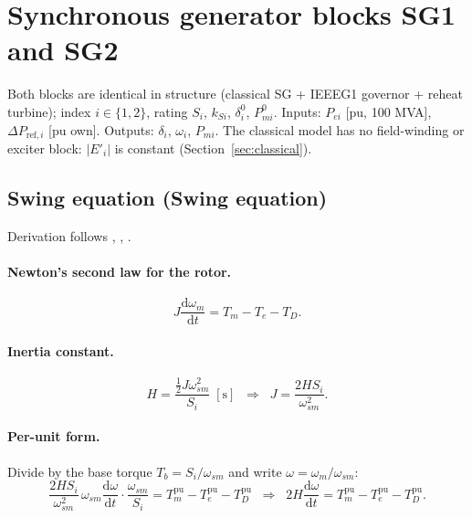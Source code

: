 \documentclass[11pt,a4paper]{article}
\numberwithin{equation}{section}
\newcommand{\dd}{\mathrm{d}}
\newcommand{\blk}[1]{\textsf{#1}}
\begin{document}
\section{Synchronous generator blocks \blk{SG1} and \blk{SG2}}
Both blocks are identical in structure (classical SG + IEEEG1 governor + reheat turbine); index $i\in\{1,2\}$, rating $S_i$, $k_{Si}$, $\delta_i^0$, $P_{mi}^0$.
Inputs: $P_{ei}$ [pu, 100 MVA], $\Delta P_{\text{ref},i}$ [pu own]. Outputs: $\delta_i$, $\omega_i$, $P_{mi}$.
The classical model has no field-winding or exciter block: $|E'_i|$ is constant (Section~\ref{sec:classical}).

\subsection{Swing equation (\blk{Swing equation})}
Derivation follows \cite[Ch.~3]{Kundur1994}, \cite[Ch.~3]{SauerPai1998}, \cite{KothariNagrath2011}.
\paragraph{Newton's second law for the rotor.}
\begin{equation}
J\frac{\dd\omega_{m}}{\dd t} = T_m - T_e - T_D .
\end{equation}
\paragraph{Inertia constant.}
\begin{equation}
H = \frac{\tfrac12 J\omega_{sm}^2}{S_i}\;[\text{s}]
\;\;\Longrightarrow\;\;
J = \frac{2HS_i}{\omega_{sm}^2}.
\end{equation}
\paragraph{Per-unit form.} Divide by the base torque $T_b = S_i/\omega_{sm}$ and write $\omega = \omega_m/\omega_{sm}$:
\begin{equation}
\frac{2HS_i}{\omega_{sm}^2}\,\omega_{sm}\frac{\dd\omega}{\dd t}\cdot\frac{\omega_{sm}}{S_i}
= T_m^{\text{pu}} - T_e^{\text{pu}} - T_D^{\text{pu}}
\;\;\Longrightarrow\;\;
2H\frac{\dd\omega}{\dd t} = T_m^{\text{pu}} - T_e^{\text{pu}} - T_D^{\text{pu}} .
\end{equation}
\end{document}
